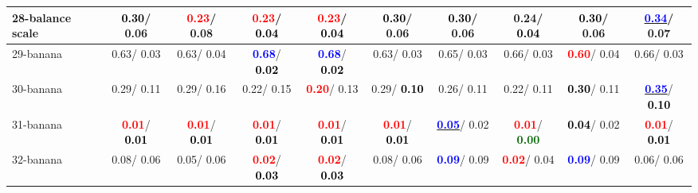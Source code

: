 \begin{table}[h]
\begin{center}
{\begin{tabular}{lc|c|c|c|c|c|c|c|c}
28-balance scale & \textcolor{black}{\textbf{  0.30}}/  0.06 & \textcolor{red}{\textbf{  0.23}}/  0.08 & \textcolor{red}{\textbf{  0.23}}/\textcolor{black}{\textbf{  0.04}} & \textcolor{red}{\textbf{  0.23}}/\textcolor{black}{\textbf{  0.04}} & \textcolor{black}{\textbf{  0.30}}/  0.06 & \textcolor{black}{\textbf{  0.30}}/  0.06 &   0.24/\textcolor{black}{\textbf{  0.04}} & \textcolor{black}{\textbf{  0.30}}/  0.06 & \underline{\textcolor{blue}{\textbf{  0.34}}}/  0.07 \\ \hline
29-banana &   0.63/  0.03 &   0.63/  0.04 & \textcolor{blue}{\textbf{  0.68}}/\textcolor{black}{\textbf{  0.02}} & \textcolor{blue}{\textbf{  0.68}}/\textcolor{black}{\textbf{  0.02}} &   0.63/  0.03 &   0.65/  0.03 &   0.66/  0.03 & \textcolor{red}{\textbf{  0.60}}/  0.04 &   0.66/  0.03 \\
30-banana &   0.29/  0.11 &   0.29/  0.16 &   0.22/  0.15 & \textcolor{red}{\textbf{  0.20}}/  0.13 &   0.29/\textcolor{black}{\textbf{  0.10}} &   0.26/  0.11 &   0.22/  0.11 & \textcolor{black}{\textbf{  0.30}}/  0.11 & \underline{\textcolor{blue}{\textbf{  0.35}}}/\textcolor{black}{\textbf{  0.10}} \\
31-banana & \textcolor{red}{\textbf{  0.01}}/\textcolor{black}{\textbf{  0.01}} & \textcolor{red}{\textbf{  0.01}}/\textcolor{black}{\textbf{  0.01}} & \textcolor{red}{\textbf{  0.01}}/\textcolor{black}{\textbf{  0.01}} & \textcolor{red}{\textbf{  0.01}}/\textcolor{black}{\textbf{  0.01}} & \textcolor{red}{\textbf{  0.01}}/\textcolor{black}{\textbf{  0.01}} & \underline{\textcolor{blue}{\textbf{  0.05}}}/  0.02 & \textcolor{red}{\textbf{  0.01}}/\textcolor{darkgreen}{\textbf{  0.00}} & \textcolor{black}{\textbf{  0.04}}/  0.02 & \textcolor{red}{\textbf{  0.01}}/\textcolor{black}{\textbf{  0.01}} \\
32-banana &   0.08/  0.06 &   0.05/  0.06 & \textcolor{red}{\textbf{  0.02}}/\textcolor{black}{\textbf{  0.03}} & \textcolor{red}{\textbf{  0.02}}/\textcolor{black}{\textbf{  0.03}} &   0.08/  0.06 & \textcolor{blue}{\textbf{  0.09}}/  0.09 & \textcolor{red}{\textbf{  0.02}}/  0.04 & \textcolor{blue}{\textbf{  0.09}}/  0.09 &   0.06/  0.06 \\\end{tabular}}\label{stratsALCKappa0AllReduxalla}
\end{center}
\end{table}
